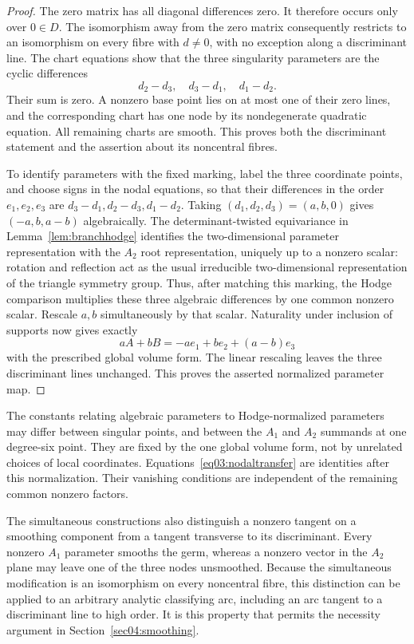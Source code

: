 \begin{proof}
The zero matrix has all diagonal differences zero.  It therefore
occurs only over $0\in D$.  The isomorphism away from the zero
matrix consequently restricts to an isomorphism on every fibre with
$d\ne0$, with no exception along a discriminant line.  The chart
equations show that the three singularity parameters are the cyclic
differences
\[
 d_2-d_3,\quad d_3-d_1,\quad d_1-d_2.
\]
Their sum is zero.  A nonzero base point lies on at most one of their
zero lines, and the corresponding chart has one node by its
nondegenerate quadratic equation.  All remaining charts are smooth.
This proves both the discriminant statement and the assertion about
its noncentral fibres.

To identify parameters with the fixed marking, label the three
coordinate points, and choose signs in the nodal equations, so that
their differences in the order $e_1,e_2,e_3$ are
$d_3-d_1,d_2-d_3,d_1-d_2$.  Taking
$(d_1,d_2,d_3)=(a,b,0)$ gives $(-a,b,a-b)$ algebraically.
The determinant-twisted equivariance in
Lemma~\ref{lem:branchhodge} identifies the two-dimensional parameter
representation with the $A_2$ root representation, uniquely up to a
nonzero scalar: rotation and reflection act as the usual irreducible
two-dimensional representation of the triangle symmetry group.
Thus, after matching this marking, the Hodge comparison multiplies
these three algebraic differences by one common nonzero scalar.
Rescale $a,b$ simultaneously by that scalar.  Naturality under
inclusion of supports now gives exactly
\[
 aA+bB=-a e_1+b e_2+(a-b)e_3
\]
with the prescribed global volume form.  The linear rescaling leaves
the three discriminant lines unchanged.  This proves the asserted
normalized parameter map.
\end{proof}

The constants relating algebraic parameters to Hodge-normalized
parameters may differ between singular points, and between the
$A_1$ and $A_2$ summands at one degree-six point.  They are fixed by
the one global volume form, not by unrelated choices of local
coordinates.  Equations~\eqref{eq03:nodaltransfer} are identities
after this normalization.  Their vanishing conditions are independent
of the remaining common nonzero factors.

The simultaneous constructions also distinguish a nonzero tangent
on a smoothing component from a tangent transverse to its
discriminant.  Every nonzero $A_1$ parameter smooths the germ, whereas
a nonzero vector in the $A_2$ plane may leave one of the three nodes
unsmoothed.  Because the simultaneous modification is an isomorphism
on every noncentral fibre, this distinction can be applied to an
arbitrary analytic classifying arc, including an arc tangent to a
discriminant line to high order.  It is this property that permits
the necessity argument in Section~\ref{sec04:smoothing}.

